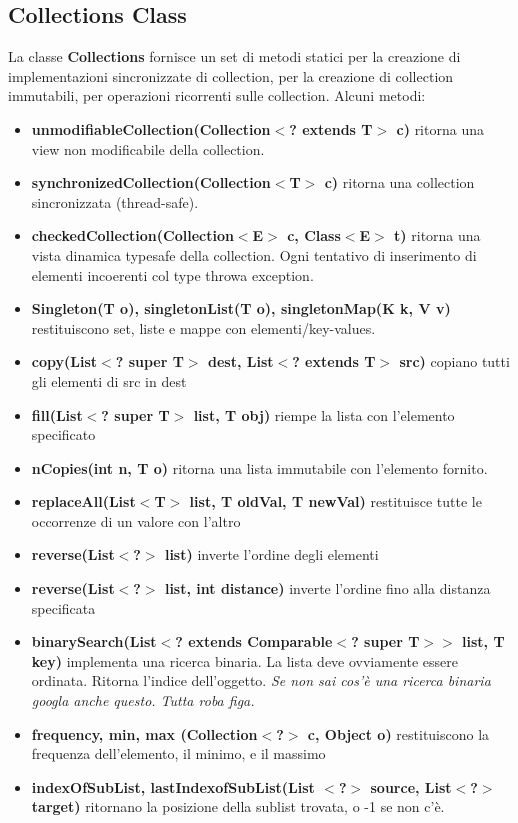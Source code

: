 \documentclass[11pt]{article}
\begin{document}
\subsection{Collections Class}
La classe \textbf{Collections} fornisce un set di metodi statici per la creazione di implementazioni sincronizzate di collection, per la creazione di collection immutabili, per operazioni ricorrenti sulle collection.
Alcuni metodi:
\begin{itemize}
    \item \textbf{unmodifiableCollection(Collection$<$? extends T$>$ c)} ritorna una view non modificabile della collection. 
    \item \textbf{synchronizedCollection(Collection$<$T$>$ c)} ritorna una collection sincronizzata (thread-safe).
    \item \textbf{checkedCollection(Collection$<$E$>$ c, Class$<$E$>$ t)} ritorna una vista dinamica typesafe della collection. Ogni tentativo di inserimento di elementi incoerenti col type throwa exception.
    \item \textbf{Singleton(T o), singletonList(T o), singletonMap(K k, V v)} restituiscono set, liste e mappe con elementi/key-values.
    \item \textbf{copy(List$<$? super T$>$ dest, List$<$? extends T$>$ src)} copiano tutti gli elementi di src in dest 
    \item \textbf{fill(List$<$? super T$>$ list, T obj)} riempe la lista con l'elemento specificato 
    \item \textbf{nCopies(int n, T o)} ritorna una lista immutabile con l'elemento fornito.
    \item \textbf{replaceAll(List$<$T$>$ list, T oldVal, T newVal)} restituisce tutte le occorrenze di un valore con l'altro 
    \item \textbf{reverse(List$<$?$>$ list)} inverte l'ordine degli elementi
    \item \textbf{reverse(List$<$?$>$ list, int distance)} inverte l'ordine fino alla distanza specificata
    \item \textbf{binarySearch(List$<$? extends Comparable$<$? super T$>$$>$ list, T key)} implementa una ricerca binaria. La lista deve ovviamente essere ordinata. Ritorna l'indice dell'oggetto. \textit{Se non sai cos'è una ricerca binaria googla anche questo. Tutta roba figa.}
    \item \textbf{frequency, min, max (Collection$<$?$>$ c, Object o)} restituiscono la frequenza dell'elemento, il minimo, e il massimo
    \item \textbf{indexOfSubList, lastIndexofSubList(List $<$?$>$ source, List$<$?$>$ target)} ritornano la posizione della sublist trovata, o -1 se non c'è. 
\end{itemize}


\printglossary
\end{document}
